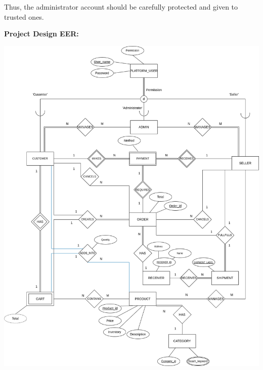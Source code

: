 \documentclass[12pt]{article}
\begin{document}
Thus, the administrator account should be carefully protected and given to trusted ones.




\newpage
\textbf{Project Design EER:}

\includegraphics[height=.80\textheight]{Diagrams/onlineShopping_revised.png}
\end{document}
